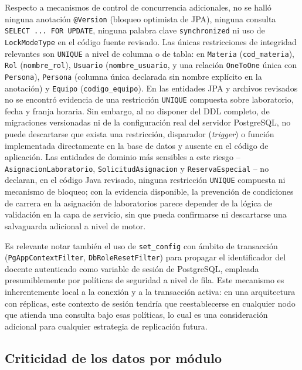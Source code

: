 \documentclass[conference]{IEEEtran}
\begin{document}
Respecto a mecanismos de control de concurrencia adicionales, no se hall\'o ninguna anotaci\'on \texttt{@Version} (bloqueo optimista de JPA), ninguna consulta \texttt{SELECT ... FOR UPDATE}, ninguna palabra clave \texttt{synchronized} ni uso de \texttt{LockModeType} en el c\'odigo fuente revisado. Las \'unicas restricciones de integridad relevantes son \texttt{UNIQUE} a nivel de columna o de tabla: en \texttt{Materia} (\texttt{cod\_materia}), \texttt{Rol} (\texttt{nombre\_rol}), \texttt{Usuario} (\texttt{nombre\_usuario}, y una relaci\'on \texttt{OneToOne} \'unica con \texttt{Persona}), \texttt{Persona} (columna \'unica declarada sin nombre expl\'icito en la anotaci\'on) y \texttt{Equipo} (\texttt{codigo\_equipo}). En las entidades JPA y archivos revisados no se encontr\'o evidencia de una restricci\'on \texttt{UNIQUE} compuesta sobre laboratorio, fecha y franja horaria. Sin embargo, al no disponer del DDL completo, de migraciones versionadas ni de la configuraci\'on real del servidor PostgreSQL, no puede descartarse que exista una restricci\'on, disparador (\emph{trigger}) o funci\'on implementada directamente en la base de datos y ausente en el c\'odigo de aplicaci\'on. Las entidades de dominio m\'as sensibles a este riesgo -- \texttt{AsignacionLaboratorio}, \texttt{SolicitudAsignacion} y \texttt{ReservaEspecial} -- no declaran, en el c\'odigo Java revisado, ninguna restricci\'on \texttt{UNIQUE} compuesta ni mecanismo de bloqueo; con la evidencia disponible, la prevenci\'on de condiciones de carrera en la asignaci\'on de laboratorios parece depender de la l\'ogica de validaci\'on en la capa de servicio, sin que pueda confirmarse ni descartarse una salvaguarda adicional a nivel de motor.

Es relevante notar tambi\'en el uso de \texttt{set\_config} con \'ambito de transacci\'on (\texttt{PgAppContextFilter}, \texttt{DbRoleResetFilter}) para propagar el identificador del docente autenticado como variable de sesi\'on de PostgreSQL, empleada presumiblemente por pol\'iticas de seguridad a nivel de fila. Este mecanismo es inherentemente local a la conexi\'on y a la transacci\'on activa: en una arquitectura con r\'eplicas, este contexto de sesi\'on tendr\'ia que reestablecerse en cualquier nodo que atienda una consulta bajo esas pol\'iticas, lo cual es una consideraci\'on adicional para cualquier estrategia de replicaci\'on futura.

\subsection{Criticidad de los datos por m\'odulo}
\end{document}
